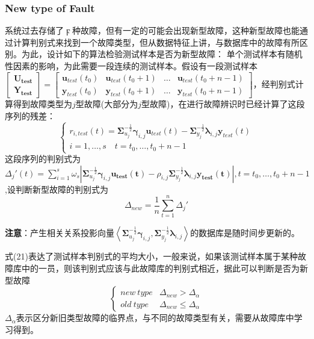 \documentclass[lang=cn,11pt,a4paper]{elegantpaper}
\begin{document}
\subsubsection{New type of Fault}
系统过去存储了$\digamma$种故障，但有一定的可能会出现新型故障，这种新型故障也能通过计算判别式来找到一个故障类型，但从数据特征上讲，与数据库中的故障有所区别。为此，设计如下的算法检验测试样本是否为新型故障：
单个测试样本有随机性因素的影响，为此需要一段连续的测试样本。假设有一段测试样本$\left[\begin{array}{c}
	\boldsymbol{U_{test}}\\
	\boldsymbol{Y_{test}}
\end{array}\right]=\left[\begin{array}{cccc}
	\boldsymbol{u}_{test}(t_0)& \boldsymbol{u}_{test}(t_0+1) &\ldots  & \boldsymbol{u}_{test}(t_0+n-1) \\
	\boldsymbol{y}_{test}(t_0)& \boldsymbol{y}_{test}(t_0+1) &\ldots  & \boldsymbol{y}_{test}(t_0+n-1)
\end{array}\right]$，经判别式计算得到故障类型为$j$型故障(大部分为$j$型故障)，在进行故障辨识时已经计算了这段序列的残差：
\begin{equation}
	\begin{cases}
		r_{i,test}(t) = \boldsymbol{\Sigma}_{u_{j}}^{-\frac{1}{2}}\boldsymbol{\gamma}_{i,j}\boldsymbol{u}_{test}(t)-\boldsymbol{\Sigma}_{y_{j}}^{-\frac{1}{2}}\boldsymbol{\lambda}_{i,j}\boldsymbol{y}_{test}(t)\\
		i = 1,\ldots,s\quad t = t_0,\ldots,t_0+n-1
	\end{cases}
\end{equation}
这段序列的判别式为$\Delta_j'(t) = \sum_{i=1}^{s}\omega_s\left|\boldsymbol{\Sigma}_{u_j}^{-\frac{1}{2}}\boldsymbol{\gamma}_{i,j}\boldsymbol{u_{test}(t)}-\rho_{i,j}\boldsymbol{\Sigma}_{y_j}^{-\frac{1}{2}}\boldsymbol{\lambda}_{i,j}\boldsymbol{y_{test}(t)}\right|,t = t_0,\ldots,t_0+n-1$,设判断新型故障的判别式为
\begin{equation}
	\Delta_{new} = \frac{1}{n}\sum_{t=1}^{n}\Delta_j' 
\end{equation}
\begin{shaded}
	{\textbf{注意}：产生相关关系投影向量$\left\langle \boldsymbol{\Sigma}_{u_{j}}^{-\frac{1}{2}}\boldsymbol{\gamma}_{i,j},\boldsymbol{\Sigma}_{y_{j}}^{-\frac{1}{2}}\boldsymbol{\lambda}_{i,j}\right\rangle $的数据库是随时间步更新的。}
\end{shaded}
式(21)表达了测试样本判别式的平均大小，一般来说，如果该测试样本属于某种故障库中的一员，则该判别式应该与此故障库的判别式相近，据此可以判断是否为新型故障
\begin{equation}
	\begin{cases}
		new\ type &\Delta_{new}>\Delta_{\alpha}
		\\
		old\ type &\Delta_{new}\leq\Delta_{\alpha}
	\end{cases}
\end{equation}
$\Delta_{\alpha}$表示区分新旧类型故障的临界点，与不同的故障类型有关，需要从故障库中学习得到。
\end{document}

